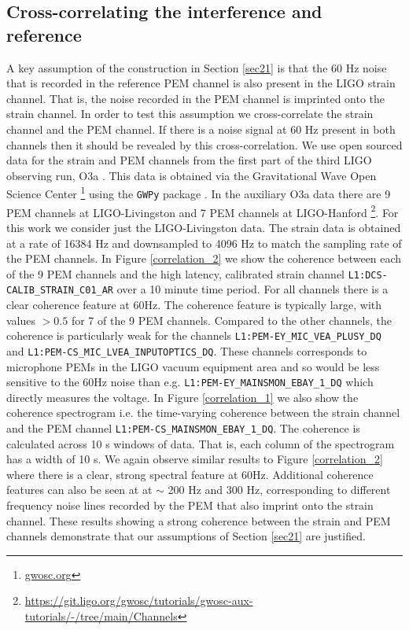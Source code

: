 \documentclass[pra,superscriptaddress,reprint,amsmath,amssymb,nofootinbib]{revtex4-2}
\newcommand{\PEMChanName}{\texttt{L1:PEM-CS\_MAINSMON\_EBAY\_1\_DQ}}
\begin{document}
\subsection{Cross-correlating the interference and reference}  \label{sec23}
A key assumption of the construction in Section \ref{sec21} is that the 60 Hz noise that is recorded in the reference PEM channel is also present in the LIGO strain channel. That is, the noise recorded in the PEM channel is imprinted onto the strain channel. In order to test this assumption we cross-correlate the strain channel and the PEM channel. If there is a noise signal at 60 Hz present in both channels then it should be revealed by this cross-correlation. We use open sourced data for the strain and PEM channels from the first part of the third LIGO observing run, O3a \cite{LIGO_O3}. This data is obtained via the Gravitational Wave
Open Science Center \footnote{\url{gwosc.org}} using the \texttt{GWPy} package \cite{gwpy}. In the auxiliary O3a data there are 9 PEM channels at LIGO-Livingston and 7 PEM channels at LIGO-Hanford \footnote{\url{https://git.ligo.org/gwosc/tutorials/gwosc-aux-tutorials/-/tree/main/Channels}}. For this work we consider just the LIGO-Livingston data. The strain data is obtained at a rate of 16384 Hz and downsampled to 4096 Hz to match the sampling rate of the PEM channels. In Figure \ref{correlation_2} we show the coherence between each of the 9 PEM channels and the high latency, calibrated strain channel \texttt{L1:DCS-CALIB\_STRAIN\_C01\_AR} over a 10 minute time period. For all channels there is a clear coherence feature at 60Hz. The coherence feature is typically large, with values $> 0.5$ for 7 of the 9 PEM channels. Compared to the other channels, the coherence is particularly weak for the channels \texttt{L1:PEM-EY\_MIC\_VEA\_PLUSY\_DQ} and \texttt{L1:PEM-CS\_MIC\_LVEA\_INPUTOPTICS\_DQ}. These channels corresponds to microphone PEMs in the LIGO vacuum equipment area and so would be less sensitive to the 60Hz noise than e.g. \texttt{L1:PEM-EY\_MAINSMON\_EBAY\_1\_DQ} which directly measures the voltage. In Figure \ref{correlation_1} we also show the coherence spectrogram i.e. the time-varying coherence between the strain channel and the PEM channel \PEMChanName.  The coherence is calculated across 10 s windows of data. That is, each column of the spectrogram has a width of 10 s. We again observe similar results to Figure \ref{correlation_2} where there is a clear, strong spectral feature at 60Hz. Additional coherence features can also be seen at at $\sim$ 200 Hz and 300 Hz, corresponding to different frequency noise lines recorded by the PEM that also imprint onto the strain channel. These results showing a strong coherence between the strain and PEM channels demonstrate that our assumptions of Section \ref{sec21} are justified.
\end{document}
